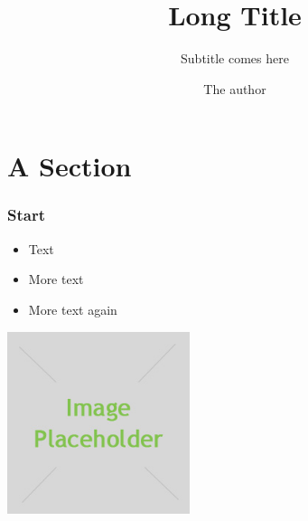 \title[Short Title]{Long Title}
\subtitle{Subtitle comes here}
\author{The author}
\date{}



\maketitle



\section{A Section}

\begin{frame} 
\frametitle{Start}
\begin{itemize}[<+->]
 \item Text
 \item More text
 \item More text again
\end{itemize}
\begin{center}
  \includegraphics[width=0.4\textwidth]{./placeholder.jpg}
\end{center}
\end{frame}

